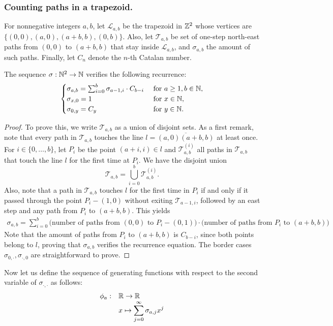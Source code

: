  \subsubsection{Counting paths in a trapezoid.} For nonnegative integers $a,b$, let $\mathcal L_{a,b}$ be the trapezoid in $\mathbb{Z}^2$ whose vertices are
 $\{(0,0),(a,0),(a+b,b),(0,b)\}.$ Also, let $\mathcal{T}_{a,b}$ be set of one-step north-east paths from $(0,0)$ to $(a+b,b)$ that stay inside $\mathcal L_{a,b}$, and  $\sigma_{a,b}$ the amount of such paths. Finally, let $C_n$ denote the $n$-th Catalan number. 
 \begin{myprop}
    \label{sigma-recurrence}
    The sequence $\sigma:\mathbb{N}^2\to \mathbb{N}$ verifies the following recurrence:
    $$\begin{cases}
    \sigma_{a,b}=\sum_{i=0}^b\sigma_{a-1,i}\cdot C_{b-i}& \mbox{ for }a\geq 1,b\in \mathbb{N},\\
    \sigma_{x,0}=1 & \mbox{ for }x\in \mathbb{N},\\
    \sigma_{0,y}=C_y & \mbox{ for }y\in \mathbb{N}.
    \end{cases}$$
 \end{myprop}
 \begin{proof}
    To prove this, we write $\mathcal T_{a,b}$ as a union of disjoint sets. As a first remark, note that every path in $\mathcal T_{a,b}$ touches the line $l=\overline{(a,0)(a+b,b)}$ at least once. For $i\in \{0,\dots,b\}$, let $P_i$ be the point $(a+i,i)\in l$ and $\mathcal T_{a,b}^{(i)}$ all paths in $\mathcal T_{a,b}$ that touch the line $l$ for the first time at $P_i$. We have the disjoint union
    $$\mathcal T_{a,b}=\bigcup_{i=0}^b \mathcal T_{a,b}^{(i)}.$$
    Also, note that a path in $\mathcal T_{a,b}$ touches $l$ for the first time in $P_i$ if and only if it passed through the point $P_i-(1,0)$ without exiting $\mathcal T_{a-1,i}$, followed by an east step and any path from $P_i$ to $(a+b,b)$. This yields
    \begin{eqnarray*}
        \sigma_{a,b}=\sum_{i=0}^{b}\mbox{(number of paths from $(0,0)$ to $P_i-(0,1))$}\cdot \mbox{(number of paths from $P_i$ to $(a+b,b))$}
    \end{eqnarray*}
    Note that the amount of paths from $P_i$ to $(a+b,b)$ is $C_{b-i}$, since both points belong to $l$, proving that $\sigma_{a,b}$ verifies the recurrence equation. The border cases $\sigma_{0,\cdot},\sigma_{\cdot,0}$ are straightforward to prove. 
 \end{proof}
 
 Now let us define the sequence of generating functions with respect to the second variable of $\sigma_{\cdot,\cdot}$ as follows:
 $$\begin{array}{cl}
 \phi_a:&\mathbb{R}\to \mathbb{R}\\
 &x\mapsto \displaystyle \sum_{j=0}^{\infty}\sigma_{a,j}x^j
 \end{array}$$
 
